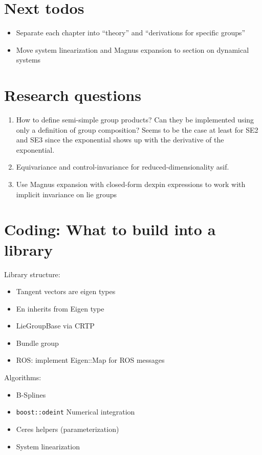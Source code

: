 

\section{Next todos}

\begin{itemize}
  \item Separate each chapter into ``theory'' and ``derivations for specific groups''
  \item Move system linearization and Magnus expansion to section on dynamical systems
\end{itemize}

\section{Research questions}

\begin{enumerate}
  \item How to define semi-simple group products? Can they be implemented using only a definition of group composition? Seems to be the case at least for SE2 and SE3 since the exponential shows up with the derivative of the exponential.
  \item Equivariance and control-invariance for reduced-dimensionality asif.
  \item Use Magnus expansion with closed-form dexpin expressions to work with implicit invariance on lie groups
\end{enumerate}


\section{Coding: What to build into a library}

Library structure:
\begin{itemize}
  \item Tangent vectors are eigen types
  \item En inherits from Eigen type
  \item LieGroupBase via CRTP
  \item Bundle group
  \item ROS: implement Eigen::Map for ROS messages
\end{itemize}

Algorithms:
\begin{itemize}
  \item B-Splines
  \item \texttt{boost::odeint} Numerical integration
  \item Ceres helpers (parameterization)
  \item System linearization
\end{itemize}


